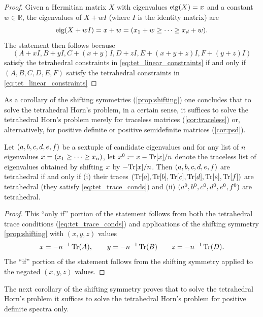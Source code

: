 \documentclass[notitlepage, 10pt]{article}
\begin{document}
\begin{proof}
    Given a Hermitian matrix $X$ with eigenvalues $\operatorname{eig}(X) = x$ and a constant $w \in \mathbb R$, the eigenvalues of $X+wI$ (where $I$ is the identity matrix) are
    \begin{equation}
        \operatorname{eig}(X+wI) = x + w = (x_1 + w \geq \cdots \geq x_d + w).
    \end{equation}
    The statement then follows because
    \begin{equation}
        (A+xI,B+yI,C+(x+y)I,D+zI, E+(x+y+z)I, F+(y+z)I)
    \end{equation}
    satisfy the tetrahedral constraints in \cref{eq:tet_linear_constraints} if and only if $(A,B,C,D,E,F)$ satisfy the tetrahedral constraints in \cref{eq:tet_linear_constraints}
\end{proof}
As a corollary of the shifting symmetries (\cref{prop:shifting}) one concludes that to solve the tetrahedral Horn's problem, in a certain sense, it suffices to solve the tetrahedral Horn's problem merely for traceless matrices (\cref{cor:traceless}) or, alternatively, for positive definite or positive semidefinite matrices (\cref{cor:psd}).
\begin{cor}
    \label{cor:traceless}
    Let $(a, b, c, d, e, f)$ be a sextuple of candidate eigenvalues and for any list of $n$ eigenvalues $x = (x_1 \geq \cdots \geq x_n)$, let $x^{0} \coloneqq x - {\operatorname{Tr}[x]}/n$ denote the traceless list of eigenvalues obtained by shifting $x$ by $-{\operatorname{Tr}[x]}/n$.
    Then $(a, b, c, d, e, f)$ are tetrahedral if and only if (i) their traces $({\operatorname{Tr}[a]}, {\operatorname{Tr}[b]}, {\operatorname{Tr}[c]}, {\operatorname{Tr}[d]}, {\operatorname{Tr}[e]}, {\operatorname{Tr}[f]})$ are tetrahedral (they satisfy \cref{eq:tet_trace_conds}) and (ii) $(a^0, b^0, c^0, d^0, e^0, f^0)$ are tetrahedral.
\end{cor}
\begin{proof}
    This ``only if'' portion of the statement follows from both the tetrahedral trace conditions (\cref{eq:tet_trace_conds}) and applications of the shifting symmetry \cref{prop:shifting} with $(x,y,z)$ values
    \begin{equation}
        x = - n^{-1}\operatorname{Tr}(A), \qquad
        y = - n^{-1}\operatorname{Tr}(B) \qquad
        z = - n^{-1}\operatorname{Tr}(D).
    \end{equation}
    The ``if'' portion of the statement follows from the shifting symmetry applied to the negated $(x,y,z)$ values.
\end{proof}
The next corollary of the shifting symmetry proves that to solve the tetrahedral Horn's problem it suffices to solve the tetrahedral Horn's problem for positive definite spectra only.
\end{document}
